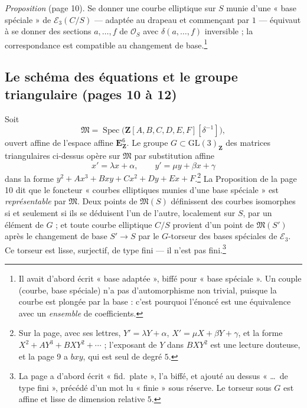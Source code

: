 \documentclass[11pt,a4paper]{article}
\begin{document}
\emph{Proposition} (page 10). Se donner une courbe elliptique sur $S$ munie
d'une « base spéciale » de $\mathcal{E}_3(C/S)$ --- adaptée au drapeau et
commençant par $1$ --- équivaut à se donner des sections $a, \ldots, f$ de
$\mathcal{O}_S$ avec $\delta(a, \ldots, f)$ inversible ; la correspondance est
compatible au changement de base.\footnote{Il avait d'abord écrit « base
adaptée », biffé pour « base spéciale ». Un couple (courbe, base spéciale) n'a
pas d'automorphisme non trivial, puisque la courbe est plongée par la base :
c'est pourquoi l'énoncé est une équivalence avec un \emph{ensemble} de
coefficients.}

\subsection*{Le schéma des équations et le groupe triangulaire (pages 10 à 12)}

Soit
\[
\mathfrak{M} = \operatorname{Spec}\bigl(\mathbf{Z}[A, B, C, D, E, F][\delta^{-1}]\bigr),
\]
ouvert affine de l'espace affine $\mathbf{E}^6_{\mathbf{Z}}$. Le groupe $G
\subset \mathrm{GL}(3)_{\mathbf{Z}}$ des matrices triangulaires ci-dessus opère
sur $\mathfrak{M}$ par substitution affine
\[
x' = \lambda x + \alpha, \qquad y' = \mu y + \beta x + \gamma
\]
dans la forme $y^2 + Ax^3 + Bxy + Cx^2 + Dy + Ex + F$.\footnote{Sur la page,
avec ses lettres, $Y' = \lambda Y + \alpha$, $X' = \mu X + \beta Y + \gamma$, et
la forme $X^2 + AY^3 + BXY^2 + \cdots$ ; l'exposant de $Y$ dans $BXY^2$ est une
lecture douteuse, et la page 9 a $bxy$, qui est seul de degré $5$.} La
Proposition de la page 10 dit que le foncteur « courbes elliptiques munies
d'une base spéciale » est \emph{représentable} par $\mathfrak{M}$. Deux points
de $\mathfrak{M}(S)$ définissent des courbes isomorphes si et seulement si ils
se déduisent l'un de l'autre, localement sur $S$, par un élément de $G$ ; et
toute courbe elliptique $C/S$ provient d'un point de $\mathfrak{M}(S')$ après
le changement de base $S' \to S$ par le $G$-torseur des bases spéciales de
$\mathcal{E}_3$. Ce torseur est lisse, surjectif, de type fini --- il n'est pas
fini.\footnote{La page a d'abord écrit « fid.\ plate », l'a biffé, et ajouté au
dessus « \ldots\ de type fini », précédé d'un mot lu « finie » sous réserve.
Le torseur sous $G$ est affine et lisse de dimension relative $5$.}
\end{document}
